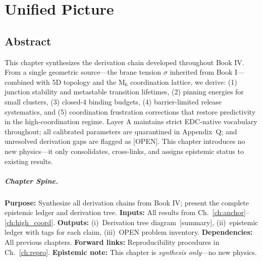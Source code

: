 
\chapter{Unified Picture}
\label{ch:unified}

\section*{Abstract}

This chapter synthesizes the derivation chain developed throughout Book IV.
From a single geometric source---the brane tension $\sigma$ inherited from
Book I---combined with 5D topology and the M$_6$ coordination lattice, we
derive: (1) junction stability and metastable transition lifetimes,
(2) pinning energies for small clusters, (3) closed-4 binding budgets,
(4) barrier-limited release systematics, and (5) coordination frustration
corrections that restore predictivity in the high-coordination regime.
Layer A maintains strict EDC-native vocabulary throughout; all calibrated
parameters are quarantined in Appendix~Q; and unresolved derivation gaps
are flagged as [OPEN]. This chapter introduces no new physics---it only
consolidates, cross-links, and assigns epistemic status to existing results.

\paragraph{Chapter Spine.}
\textbf{Purpose:} Synthesize all derivation chains from Book IV; present the
complete epistemic ledger and derivation tree.
\textbf{Inputs:} All results from Ch.~\ref{ch:anchor}--\ref{ch:high_coord}.
\textbf{Outputs:} (i)~Derivation tree diagram~[summary], (ii)~epistemic ledger
with tags for each claim, (iii)~OPEN problem inventory.
\textbf{Dependencies:} All previous chapters.
\textbf{Forward links:} Reproducibility procedures in Ch.~\ref{ch:repro}.
\textbf{Epistemic note:} This chapter is \emph{synthesis only}---no new physics.

